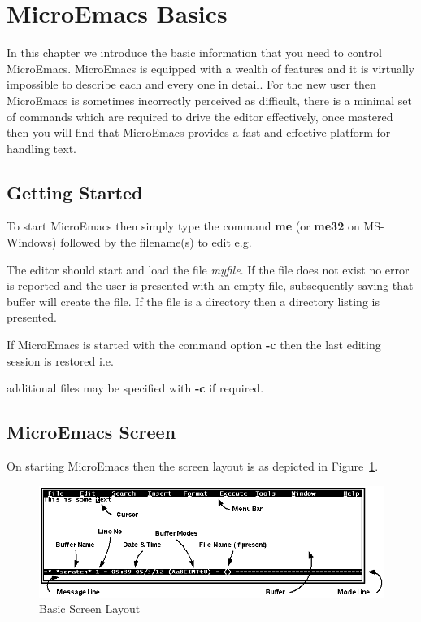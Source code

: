 \documentclass[11pt,a4paper,pdftex]{article}
\begin{document}

\cleardoublepage
\section{MicroEmacs Basics}

  In this chapter we introduce the basic information that you need to control
  MicroEmacs. MicroEmacs is equipped with a wealth of features and it is
  virtually impossible to describe each and every one in detail. For the new
  user then MicroEmacs is sometimes incorrectly perceived as difficult, there
  is a minimal set of commands which are required to drive the editor
  effectively, once mastered then you will find that MicroEmacs provides a
  fast and effective platform for handling text.

\subsection{Getting Started}

  To start MicroEmacs then simply type the command \textbf{me} (or
  \textbf{me32} on MS-Windows) followed by the filename(s) to edit e.g.


  The editor should start and load the file \textit{myfile}. If the file does
  not exist no error is reported and the user is presented with an empty file,
  subsequently saving that buffer will create the file. If the file is a
  directory then a directory listing is presented.

  If MicroEmacs is started with the command option \textbf{-c} then the last
  editing session is restored i.e.

  
  additional files may be specified with \textbf{-c} if required.

\subsection{MicroEmacs Screen}

  On starting MicroEmacs then the screen layout is as depicted in
  Figure~\ref{fig:basicscreen}.

  \begin{figure}[!hbt]
    \begin{center}
      \includegraphics[keepaspectratio,width=5in]{basicscreenannot}
      \caption{Basic Screen Layout}
      \label{fig:basicscreen}
    \end{center}
  \end{figure}
\end{document}
